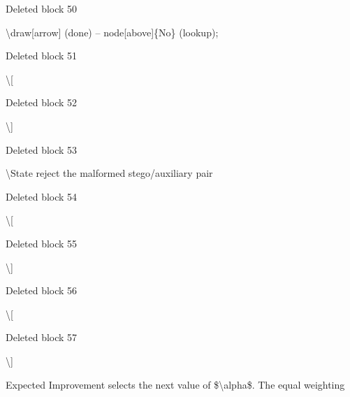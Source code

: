 \documentclass[a4paper,fleqn]{cas-dc}
\newenvironment{RevisionDeletion}{%
  \par\begingroup\color{revisionred}\footnotesize\ttfamily
  \setlength{\parindent}{0pt}\setlength{\parskip}{1pt}\obeyspaces
}{\par\endgroup}
\begin{document}
\begin{RevisionDeletion}
Deleted block 50\par
\textbackslash{}draw[arrow] (done) -- node[above]\{No\} (lookup);\par
\end{RevisionDeletion}

\begin{RevisionDeletion}
Deleted block 51\par
\textbackslash{}[\par
\end{RevisionDeletion}

\begin{RevisionDeletion}
Deleted block 52\par
\textbackslash{}]\par
\end{RevisionDeletion}

\begin{RevisionDeletion}
Deleted block 53\par
    \textbackslash{}State reject the malformed stego/auxiliary pair\par
\end{RevisionDeletion}

\begin{RevisionDeletion}
Deleted block 54\par
\textbackslash{}[\par
\end{RevisionDeletion}

\begin{RevisionDeletion}
Deleted block 55\par
\textbackslash{}]\par
\end{RevisionDeletion}

\begin{RevisionDeletion}
Deleted block 56\par
\textbackslash{}[\par
\end{RevisionDeletion}

\begin{RevisionDeletion}
Deleted block 57\par
\textbackslash{}]\par
Expected Improvement selects the next value of \$\textbackslash{}alpha\$. The equal weighting\par
\end{RevisionDeletion}
\end{document}
